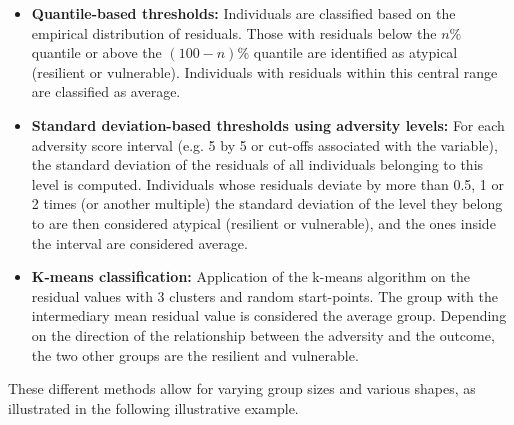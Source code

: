 \documentclass[12pt]{article}
\begin{document}
\begin{itemize}
After fitting the model, we use the \texttt{posterior\_linpred()} function to generate \(S=1000 \) draws from the posterior predictive distribution of the expected outcome for each individual, conditional on their observed adversity level. Specifically, for each \( x_j \), we compute:

\[
\hat{y}_j^{(s)} = \beta_0^{(s)} + \beta_1^{(s)} x_j \quad \text{for } s = 1, \ldots, S\, ,
\]

where \( \hat{y}_j^{(s)} \) is the predicted mean outcome from the \( s \)-th posterior draw. This yields a posterior distribution of expected outcomes for each individual.

To construct individual-level credibility intervals, we compute the empirical \( \alpha/2 \) and \( 1 - \alpha/2 \) quantiles of the \( \hat{y}_j^{(s)} \) values. Individuals whose observed outcome \( y_j \) falls within their corresponding \( 100(1 - \alpha)\% \) posterior credibility interval are classified as average. Those with outcomes outside the interval are classified as either resilient or vulnerable, depending on the direction of the deviation.
\item \textbf{Quantile-based thresholds:} Individuals are classified based on the empirical distribution of residuals. Those with residuals below the \( n\% \) quantile or above the \( (100-n)\% \) quantile are identified as atypical (resilient or vulnerable). Individuals with residuals within this central range are classified as average.

  \item \textbf{Standard deviation-based thresholds using adversity levels:} For each adversity score interval (e.g. 5 by 5 or cut-offs associated with the variable), the standard deviation of the residuals of all individuals belonging to this level is computed. Individuals whose residuals deviate by more than 0.5, 1 or 2 times (or another multiple) the standard deviation of the level they belong to are then considered atypical (resilient or vulnerable), and the ones inside the interval are considered average.
  \item \textbf{K-means classification:} Application of the k-means algorithm on the residual values with 3 clusters and random start-points. The group with the intermediary mean residual value is considered the average group. Depending on the direction of the relationship between the adversity and the outcome, the two other groups are the resilient and vulnerable.
\end{itemize}
These different methods allow for varying group sizes and various shapes, as illustrated in the following illustrative example.
\end{document}
